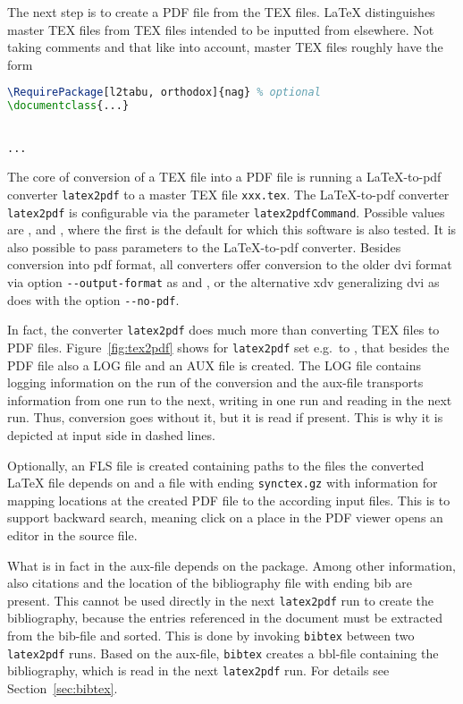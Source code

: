 The next step is to create a PDF file from the TEX files. 
\LaTeX{} distinguishes master TEX files from TEX files intended to be inputted
from elsewhere. 
Not taking comments and that like into account, 
master TEX files roughly have the form 
%
\begin{lstlisting}[language=tex, basicstyle=\small]
\RequirePackage[l2tabu, orthodox]{nag} % optional 
\documentclass{...}


...

\end{lstlisting}

The core of conversion of a TEX file into a PDF file 
is running a \LaTeX{}-to-pdf converter \texttt{latex2pdf} 
to a master TEX file \texttt{xxx.tex}. 
The \LaTeX-to-pdf converter \texttt{latex2pdf} 
is configurable via the parameter \texttt{latex2pdfCommand}. 
Possible values are \lualatex{}, \xelatex{} and \pdflatex, 
where the first is the default for which this software is also tested. 
It is also possible to pass parameters to the \LaTeX{}-to-pdf converter. 
Besides conversion into \gls{pdf} format, 
all converters offer conversion to the older \gls{dvi} format 
via option \texttt{-{}-output-format} as \lualatex{} and \pdflatex, 
or the alternative \gls{xdv} generalizing \gls{dvi} 
as \xelatex{} does with the option \texttt{-{}-no-pdf}. 

In fact, the converter \texttt{latex2pdf} 
does much more than converting TEX files to PDF files. 
Figure~\ref{fig:tex2pdf} shows for \texttt{latex2pdf} set e.g.~to \lualatex{}, 
that besides the PDF file also a LOG file and an AUX file is created. 
The LOG file contains logging information on the run of the conversion 
and the aux-file transports information from one run to the next, 
writing in one run and reading in the next run. 
Thus, conversion goes without it, but it is read if present. 
This is why it is depicted at input side in dashed lines. 

Optionally, an FLS file is created containing paths to the files 
the converted \LaTeX{} file depends on 
and a file with ending \texttt{synctex.gz} 
with information for mapping locations at the created PDF file 
to the according input files. 
This is to support backward search, meaning click on a place in the PDF viewer 
opens an editor in the source file. 

What is in fact in the aux-file depends on the package. 
Among other information, 
also citations and the location of the bibliography file with ending bib 
are present. 
This cannot be used directly in the next \texttt{latex2pdf} run 
to create the bibliography, 
because the entries referenced in the document must be extracted from the bib-file 
and sorted. 
This is done by invoking \texttt{bibtex} between two \texttt{latex2pdf} runs. 
Based on the aux-file, \texttt{bibtex} creates a bbl-file 
containing the bibliography, which is read in the next \texttt{latex2pdf} run. 
For details see Section~\ref{sec:bibtex}. 

